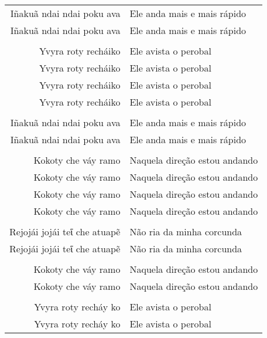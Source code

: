 \begin{itemize}
\begin{table}[]
\begin{tabular}{rl}
Iñakuã ndai ndai poku ava\footnotemark{}  & Ele anda mais e mais rápido           \\
Iñakuã ndai ndai poku ava          & Ele anda mais e mais rápido           \\
                  &                     \\
Yvyra roty recháiko& Ele avista o perobal\footnotemark{}           \\
Yvyra roty recháiko& Ele avista o perobal           \\
Yvyra roty recháiko& Ele avista o perobal           \\
Yvyra roty recháiko& Ele avista o perobal           \\
                  &                     \\
Iñakuã ndai ndai poku ava   & Ele anda mais e mais rápido           \\
Iñakuã ndai ndai poku ava   & Ele anda mais e mais rápido           \\
                  &                     \\
Kokoty che váy ramo          & Naquela direção estou andando           \\
Kokoty che váy ramo          & Naquela direção estou andando           \\
Kokoty che váy ramo          & Naquela direção estou andando           \\
Kokoty che váy ramo          & Naquela direção estou andando           \\
                  &                     \\
Rejojái jojái teῖ che atuapẽ          & Não ria da minha corcunda           \\
Rejojái jojái teῖ che atuapẽ          & Não ria da minha corcunda           \\
                  &                     \\
Kokoty che váy ramo          & Naquela direção estou andando           \\
Kokoty che váy ramo          & Naquela direção estou andando           \\
                  &                     \\
Yvyra roty recháy ko          & Ele avista o perobal           \\
Yvyra roty recháy ko          & Ele avista o perobal           \\

\end{tabular}
\end{table}
\end{itemize}
